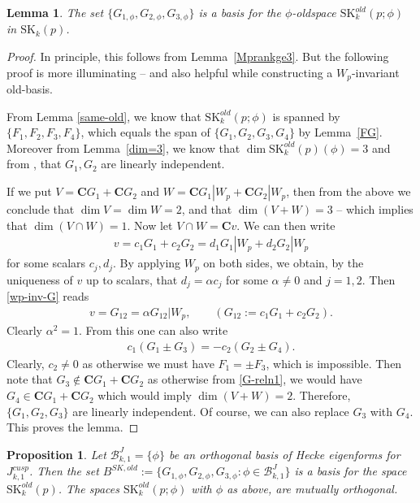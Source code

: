 \documentclass[11pt]{amsart}
\numberwithin{equation}{section}
\theoremstyle{plain}
\newtheorem{lem}[thm]{Lemma}
\newtheorem{prop}[thm]{Proposition}
\theoremstyle{definition}
\newcommand{\lemref}[1]{Lemma~\ref{#1}}
\newcommand{\C}{\mf C}
\newcommand{\mf}{\mathbf}
\newcommand{\mc}{\mathcal}
\newcommand{\mrm}{\mathrm}
\newcommand{\q}{\quad}
\newcommand{\skk}{\mrm{SK}_k}
\newcommand{\skkp}{\mrm{SK}_k(p)}
\begin{document}
\begin{lem}\label{lemskkpphi}
    The set $\{ G_{1,\phi}, G_{2,\phi}, G_{3,\phi} \}$ is a basis for the $\phi$-oldspace $\skk^{old}(p; \phi)$ in $\skkp$.
\end{lem}
\begin{proof}
In principle, this follows from \lemref{Mprankge3}. But the following proof is more illuminating -- and also helpful while constructing a $W_p$-invariant old-basis.

    From Lemma \ref{same-old},  we know that $\skk^{old}(p; \phi)$ is spanned by $\{ F_1, F_2, F_3, F_4 \}$, which equals the span of $\{ G_1, G_2, G_3, G_4 \}$ by \lemref{FG}. Moreover from \lemref{dim=3}, we know that $\dim \skk^{old}(p)(\phi)=3$ and from \cite{Ibu-SK}, that $G_1,G_2$ are linearly independent. 

    If we put $V=\C G_1+\C G_2$ and $W= \C G_1|W_p+\C G_2 |W_p$, then from the above we conclude that $\dim V=\dim W=2$, and that $\dim(V+W)=3$ -- which implies that $\dim(V \cap W)=1$. Now let $V \cap W= \C v$. We can then write
    \begin{align} \label{wp-inv-G}
        v= c_1 G_1+c_2 G_2 = d_1 G_1 |W_p +d_2 G_2 |W_p 
    \end{align}
for some scalars $c_j,d_j$. By applying $W_p$ on both sides, we obtain, by the uniqueness of $v$ up to scalars, that $d_j = \alpha c_j$ for some $\alpha \neq 0$ and $j=1,2$. Then \eqref{wp-inv-G} reads
\begin{align}
    v= G_{12} = \alpha G_{12}|W_p, \q \q (G_{12} :=c_1 G_1+c_2 G_2  ).
\end{align}
Clearly $\alpha^2=1$. From this one can also write
\begin{align} \label{G-reln1}
    c_1(G_1 \pm G_3) = -c_2(G_2 \pm G_4).
\end{align}
Clearly, $c_2 \neq 0$ as otherwise we must have $F_1 = \pm F_3$, which is impossible. Then note that $G_3 \not \in \C G_1 + \C G_2$ as otherwise from \eqref{G-reln1}, we would have $G_4 \in \C G_1+ \C G_2$ which would imply $\dim (V+W)=2$.
Therefore, $\{ G_1, G_2, G_3 \}$ are linearly independent. Of course, we can also replace $G_3$ with $G_4$. This proves the lemma.
\end{proof}
%
\begin{prop}\label{prop:oldbasis}
    Let $\mc B^J_{k,1}=\{\phi\}$ be an orthogonal  basis of Hecke eigenforms for $J_{k,1}^{cusp}$. Then the set $ B^{SK, old}:= \{G_{1,\phi}, G_{2,\phi}, G_{3,\phi}: \phi\in \mc B^J_{k,1}\}$ is a basis for the space $\skk^{old}(p)$. The spaces $\skk^{old}(p; \phi)$ with $\phi$ as above, are mutually orthogonal.
\end{prop}
\end{document}
